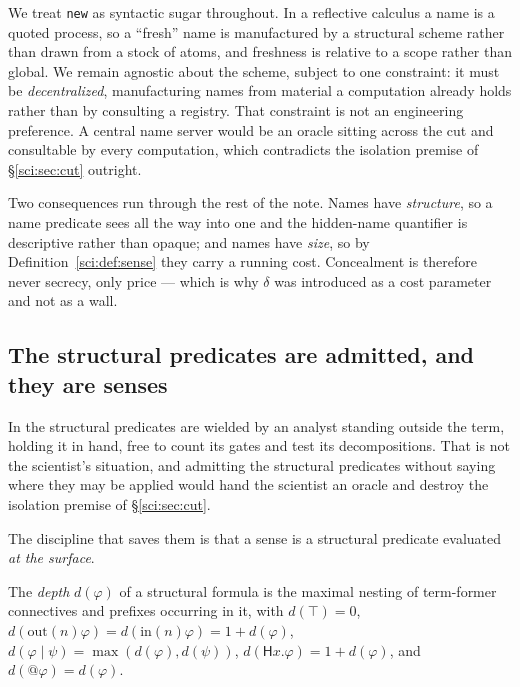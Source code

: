 \begin{remark}
\label{sci:rem:sugar}
We treat \texttt{new} as syntactic sugar throughout. In a reflective calculus a name is a quoted
process, so a ``fresh'' name is manufactured by a structural scheme rather than drawn from a stock of
atoms, and freshness is relative to a scope rather than global. We remain agnostic about the scheme,
subject to one constraint: it must be \emph{decentralized}, manufacturing names from material a
computation already holds rather than by consulting a registry. That constraint is not an engineering
preference. A central name server would be an oracle sitting across the cut and consultable by every
computation, which contradicts the isolation premise of \S\ref{sci:sec:cut} outright.

Two consequences run through the rest of the note. Names have \emph{structure}, so a name predicate
sees all the way into one and the hidden-name quantifier is descriptive rather than opaque; and names
have \emph{size}, so by Definition~\ref{sci:def:sense} they carry a running cost. Concealment is therefore
never secrecy, only price --- which is why $\delta$ was introduced as a cost parameter and not as a
wall.
\end{remark}

\subsection{The structural predicates are admitted, and they are senses}\label{sci:S3.2}

In \cite{ClassifierNote} the structural predicates are wielded by an analyst standing outside the
term, holding it in hand, free to count its gates and test its decompositions. That is not the
scientist's situation, and admitting the structural predicates without saying where they may be
applied would hand the scientist an oracle and destroy the isolation premise of \S\ref{sci:sec:cut}.

The discipline that saves them is that a sense is a structural predicate evaluated \emph{at the
surface}.

\begin{definition}[Depth]\label{sci:depth}
The \emph{depth} $d(\varphi)$ of a structural formula is the maximal nesting of term-former
connectives and prefixes occurring in it, with $d(\top) = 0$, $d(\mathrm{out}(n)\varphi) =
d(\mathrm{in}(n)\varphi) = 1 + d(\varphi)$, $d(\varphi \mid \psi) = \max(d(\varphi), d(\psi))$,
$d(\mathsf{H}x.\varphi) = 1 + d(\varphi)$, and $d(@\varphi) = d(\varphi)$.
\end{definition}


